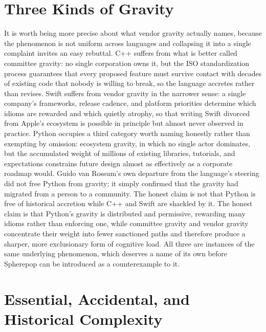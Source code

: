 \documentclass[11pt]{article}
\begin{document}
\section{Three Kinds of Gravity}

It is worth being more precise about what vendor gravity actually names, because the phenomenon is not uniform across languages and collapsing it into a single complaint invites an easy rebuttal. C++ suffers from what is better called committee gravity: no single corporation owns it, but the ISO standardization process guarantees that every proposed feature must survive contact with decades of existing code that nobody is willing to break, so the language accretes rather than revises. Swift suffers from vendor gravity in the narrower sense: a single company's frameworks, release cadence, and platform priorities determine which idioms are rewarded and which quietly atrophy, so that writing Swift divorced from Apple's ecosystem is possible in principle but almost never observed in practice. Python occupies a third category worth naming honestly rather than exempting by omission: ecosystem gravity, in which no single actor dominates, but the accumulated weight of millions of existing libraries, tutorials, and expectations constrains future design almost as effectively as a corporate roadmap would. Guido van Rossum's own departure from the language's steering did not free Python from gravity; it simply confirmed that the gravity had migrated from a person to a community. The honest claim is not that Python is free of historical accretion while C++ and Swift are shackled by it. The honest claim is that Python's gravity is distributed and permissive, rewarding many idioms rather than enforcing one, while committee gravity and vendor gravity concentrate their weight into fewer sanctioned paths and therefore produce a sharper, more exclusionary form of cognitive load. All three are instances of the same underlying phenomenon, which deserves a name of its own before Spherepop can be introduced as a counterexample to it.

\section{Essential, Accidental, and Historical Complexity}
\end{document}
